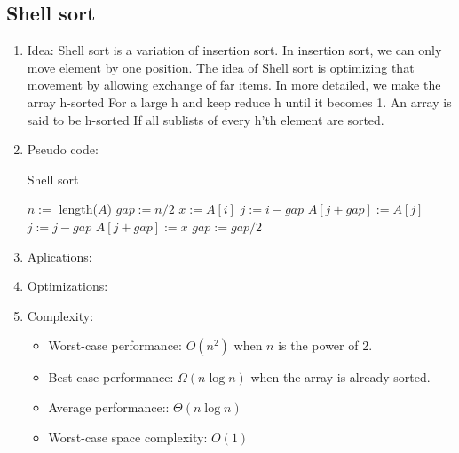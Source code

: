 \documentclass[12pt]{article}
\begin{document}
    \subsection{Shell sort}
    \begin{enumerate}
        \item Idea: Shell sort is a variation of insertion sort. In insertion sort, we can only move element by one position. The idea of Shell sort is optimizing that movement by allowing exchange of far items. In more detailed, we make the array h-sorted For a large h and keep reduce h until it becomes 1. An array is said to be h-sorted If all sublists of every h’th element are sorted.
        \item Pseudo code:
        \begin{algorithm}[H]
            \caption{Shell sort}
            \begin{algorithmic}[1]
                    \State $n:=$ length($A$)
                    \State $\textit{gap}:=n/2$
                            \State $x:=A[i]$
                            \State $j:=i-gap$
                            \State $A[j+gap]:=A[j]$
                            \State $j:=j-gap$
                            \EndWhile
                            \State $A[j+gap]:=x$
                        \EndFor
                        \State $\textit{gap}:=\textit{gap}/2$
                    \EndWhile
                \EndFunction
            \end{algorithmic}
        \end{algorithm}
        \item Aplications:
        \item Optimizations:
        \item Complexity:
        \begin{itemize}
            \item Worst-case performance: $O(n^2)$ when $n$ is the power of 2.
            \item Best-case performance: $\Omega(n\log n)$ when the array is already sorted.
            \item Average performance:: $\Theta(n\log n)$
            \item Worst-case space complexity: $O(1)$
        \end{itemize}
    \end{enumerate}
\end{document}
